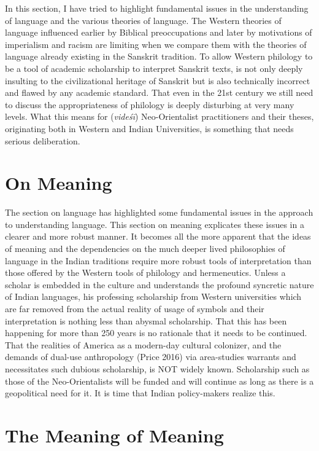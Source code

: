 In this section, I have tried to highlight fundamental issues in the understanding of language and the various theories of language. The Western theories of language influenced earlier by Biblical preoccupations and later by motivations of imperialism and racism are limiting when we compare them with the theories of language already existing in the Sanskrit tradition. To allow Western philology to be a tool of academic scholarship to interpret Sanskrit texts, is not only deeply insulting to the civilizational heritage of Sanskrit but is also technically incorrect and flawed by any academic standard. That even in the 21st century we still need to discuss the appropriateness of philology is deeply disturbing at very many levels. What this means for (\textit{videśī}) Neo-Orientalist practitioners and their theses, originating both in Western and Indian Universities, is something that needs serious deliberation.


\section*{On Meaning}

The section on language has highlighted some fundamental issues in the approach to understanding language. This section on meaning explicates these issues in a clearer and more robust manner. It becomes all the more apparent that the ideas of meaning and the dependencies on the much deeper lived philosophies of language in the Indian traditions require more robust tools of interpretation than those offered by the Western tools of philology and hermeneutics. Unless a scholar is embedded in the culture and understands the profound syncretic nature of Indian languages, his professing scholarship from Western universities which are far removed from the actual reality of usage of symbols and their interpretation is nothing less than abysmal scholarship. That this has been happening for more than 250 years is no rationale that it needs to be continued. That the realities of America as a modern-day cultural colonizer, and the demands of dual-use anthropology (Price 2016) via area-studies warrants and necessitates such dubious scholarship, is NOT widely known. Scholarship such as those of the Neo-Orientalists will be funded and will continue as long as there is a geopolitical need for it. It is time that Indian policy-makers realize this.


\section*{The Meaning of Meaning}

